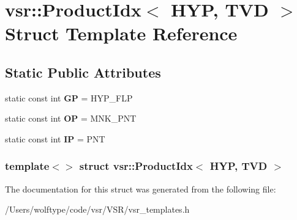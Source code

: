 \hypertarget{structvsr_1_1_product_idx_3_01_h_y_p_00_01_t_v_d_01_4}{\section{vsr\-:\-:Product\-Idx$<$ H\-Y\-P, T\-V\-D $>$ Struct Template Reference}
\label{structvsr_1_1_product_idx_3_01_h_y_p_00_01_t_v_d_01_4}
}
\subsection*{Static Public Attributes}
\begin{DoxyCompactItemize}
\item 
\hypertarget{structvsr_1_1_product_idx_3_01_h_y_p_00_01_t_v_d_01_4_aec9e791e830825cebbbdb2139becf023}{static const int {\bfseries G\-P} = H\-Y\-P\-\_\-\-F\-L\-P}\label{structvsr_1_1_product_idx_3_01_h_y_p_00_01_t_v_d_01_4_aec9e791e830825cebbbdb2139becf023}

\item 
\hypertarget{structvsr_1_1_product_idx_3_01_h_y_p_00_01_t_v_d_01_4_af2b1abe9dcdbd20ab0baa4758d57bdfd}{static const int {\bfseries O\-P} = M\-N\-K\-\_\-\-P\-N\-T}\label{structvsr_1_1_product_idx_3_01_h_y_p_00_01_t_v_d_01_4_af2b1abe9dcdbd20ab0baa4758d57bdfd}

\item 
\hypertarget{structvsr_1_1_product_idx_3_01_h_y_p_00_01_t_v_d_01_4_a773eacbfffd94ee871d7ab0cbc501d37}{static const int {\bfseries I\-P} = P\-N\-T}\label{structvsr_1_1_product_idx_3_01_h_y_p_00_01_t_v_d_01_4_a773eacbfffd94ee871d7ab0cbc501d37}

\end{DoxyCompactItemize}
\subsubsection*{template$<$$>$ struct vsr\-::\-Product\-Idx$<$ H\-Y\-P, T\-V\-D $>$}



The documentation for this struct was generated from the following file\-:\begin{DoxyCompactItemize}
\item 
/\-Users/wolftype/code/vsr/\-V\-S\-R/vsr\-\_\-templates.\-h\end{DoxyCompactItemize}
